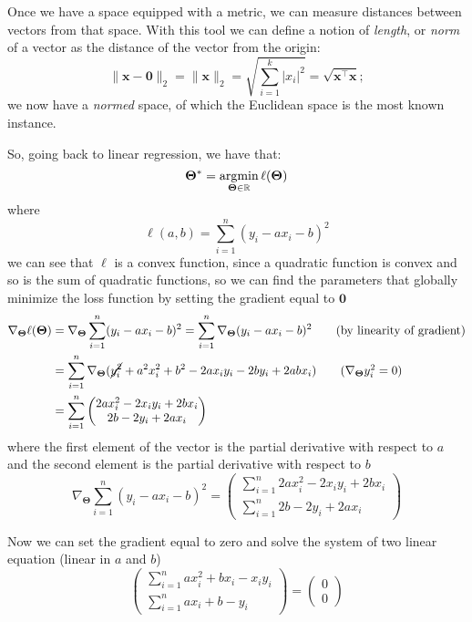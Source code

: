 Once we have a space equipped with a metric, we can measure distances between vectors from that space. With this tool we can define a notion of \emph{length}, or \emph{norm} of a vector as the distance of the vector from the origin:
\begin{equation}
	\|\mathbf{x} - \mathbf{0}\|_2 = \|\mathbf{x}\|_2 = \sqrt{\sum_{i=1}^{k}|x_i|^2} = \sqrt{\mathbf{x}^\top\mathbf{x}};
\end{equation}
we now have a \emph{normed} space, of which the Euclidean space is the most known instance.

So, going back to linear regression, we have that:
\begin{equation}
	\mathbf{\Theta}^* = \operatorname*{\operatorname{argmin}}_{\mathbf{\Theta} \in \mathbb{R}} \ell(\mathbf{\Theta})
\end{equation}
where 
\begin{equation}
	\ell(a,b) = \sum_{i=1}^{n}(y_i - ax_i - b)^2
\end{equation}
we can see that $\ell$ is a convex function, since a quadratic function is convex and so is the sum of quadratic functions, so we can find the parameters that globally minimize the loss function by setting the gradient equal to $\mathbf{0}$
\begin{align}
	\nabla_{\mathbf{\Theta}}\ell(\mathbf{\Theta}) &= \nabla_{\mathbf{\Theta}}\sum_{i=1}^{n}(y_i - ax_i - b)^2 = \sum_{i=1}^{n}\nabla_{\mathbf{\Theta}}(y_i - ax_i - b)^2 \tag{by linearity of gradient} \\
	&=  \sum_{i=1}^n \nabla_{\bm{\Theta}} (\cancel{y_i^2} + a^2 x_i^2 + b^2 -2a x_i y_i -2by_i +2abx_i) \tag{$\nabla_{\mathbf{\Theta}}y_i^2 = 0$} \\
	&= \sum_{i=1}^n \begin{pmatrix} 2ax_i^2 - 2 x_i y_i + 2bx_i \\ 2b - 2y_i + 2ax_i \end{pmatrix}
\end{align}
where the first element of the vector is the partial derivative with respect to $a$ and the second element is the partial derivative with respect to $b$
\begin{equation}
	\nabla_{\mathbf{\Theta}}\sum_{i=1}^n  ( y_i - a x_i - b )^2 = \begin{pmatrix} \sum_{i=1}^n 2ax_i^2 - 2 x_i y_i + 2bx_i \\ \sum_{i=1}^n 2b - 2y_i + 2ax_i \end{pmatrix}
\end{equation}

Now we can set the gradient equal to zero and solve the system of two linear equation (linear in $a$ and $b$)
\begin{equation}
	\begin{pmatrix} \sum_{i=1}^n ax_i^2 + bx_i  -  x_i y_i  \\ \sum_{i=1}^n ax_i + b - y_i  \end{pmatrix} = \begin{pmatrix}0\\0\end{pmatrix}
\end{equation}

